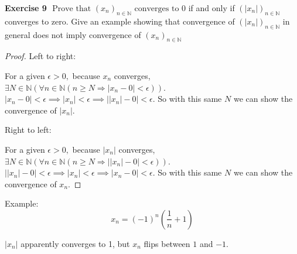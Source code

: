 \documentclass[12pt]{article}
\theoremstyle{definition}
\numberwithin{equation}{subsection}
\begin{document}
\textbf{Exercise 9} $\text { Prove that }\left(x_{n}\right)_{n \in \mathbb{N}} \text { converges to } 0 $ if and only if $\left(\left|x_{n}\right|\right)_{n \in \mathbb{N}}$converges to zero. Give an example showing that convergence of $\left(\left|x_{n}\right|\right)_{n \in \mathbb{N}}$ in general does not imply convergence of $\left(x_{n}\right)_{n \in \mathbb{N}}$
\begin{proof}

    Left to right:

    For a given $\epsilon>0,$ because $x_n$ converges, $\exists N \in \mathbb{N}\left(\forall n \in \mathbb{N}\left(n \geq N \Longrightarrow\left|x_{n}-0\right|<\epsilon\right)\right)$.
    $\left|x_{n}-0\right| < \epsilon \implies |x_n| < \epsilon \implies \left|\left|x_{n}\right|-0\right| < \epsilon$. So with this same $N$ we can show the convergence of $|x_n|$. 

    Right to left:

    For a given $\epsilon>0,$ because $|x_n|$ converges, $\exists N \in \mathbb{N}\left(\forall n \in \mathbb{N}\left(n \geq N \Longrightarrow\left||x_{n}|-0\right|<\epsilon\right)\right)$.
    $\left||x_{n}|-0\right| < \epsilon \implies |x_n| < \epsilon \implies \left|x_{n}-0\right| < \epsilon$. So with this same $N$ we can show the convergence of $x_n$. 

\end{proof}

Example: $$
x_n = (-1)^n(\frac{1}{n}+1)
$$

$|x_n|$ apparently converges to 1, but $x_n$ flips between $1$ and $-1$. 
\end{document}
